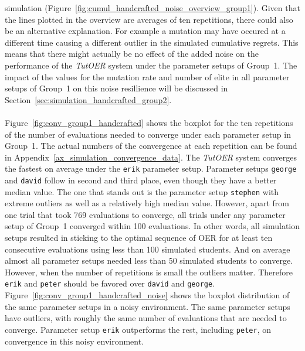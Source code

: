 simulation (Figure~\ref{fig:cumul_handcrafted_noise_overview_group1}).
Given that the lines plotted in the overview are averages of ten repetitions,
there could also be an alternative explanation. For example a mutation may have
occured at a different time causing a different outlier in the simulated
cumulative regrets. This means that there might actually be no effect of the
added noise on the performance of the \emph{TutOER} system under the parameter
setups of Group~1. The impact of the values for the mutation rate and
number of elite in all parameter setups of Group~1 on this noise resillience
will be discussed in Section~\ref{sec:simulation_handcrafted_group2}.\\\\
\noindent
Figure~\ref{fig:conv_group1_handcrafted} shows the boxplot for the ten
repetitions of the number of evaluations needed to converge under each
parameter setup in Group~1. The actual numbers of the convergence at each repetition
can be found in Appendix~\ref{ax_simulation_convergence_data}. The \emph{TutOER} system
converges the fastest on average under the \texttt{erik} parameter setup.
Parameter setups \texttt{george} and \texttt{david} follow in second and third
place, even though they have a better median value. The one that stands out is
the parameter setup \texttt{stephen} with extreme outliers as well as a
relatively high median value. However, apart from one trial that took 769
evaluations to converge, all trials under any parameter setup of Group~1
converged within 100 evaluations. In other words, all simulation setups
resulted in sticking to the optimal sequence of OER for at least ten
consecutive evaluations using less than 100 simulated students. And on average
almost all parameter setups needed less than 50 simulated students to
converge. However, when the number of repetitions is small the outliers matter.
Therefore \texttt{erik} and \texttt{peter} should be favored over
\texttt{david} and \texttt{george}. Figure~\ref{fig:conv_group1_handcrafted_noise}
shows the boxplot distribution of the same parameter setups in a noisy
environment. The same parameter setups have outliers, with roughly the same
number of evaluations that are needed to converge. Parameter setup
\texttt{erik} outperforms the rest, including \texttt{peter}, on convergence in
this noisy environment.
